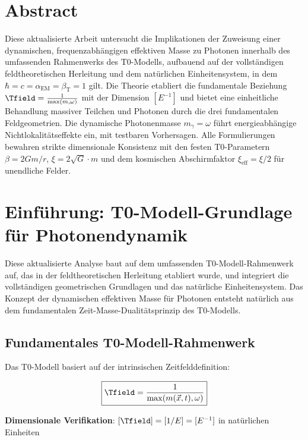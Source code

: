 \section*{Abstract}
		Diese aktualisierte Arbeit untersucht die Implikationen der Zuweisung einer dynamischen, frequenzabhängigen effektiven Masse zu Photonen innerhalb des umfassenden Rahmenwerks des T0-Modells, aufbauend auf der vollständigen feldtheoretischen Herleitung und dem natürlichen Einheitensystem, in dem $\hbar = c = \alpha_{\text{EM}} = \beta_{\text{T}} = 1$ gilt. Die Theorie etabliert die fundamentale Beziehung $\Tfield = \frac{1}{\max(m, \omega)}$ mit der Dimension $[E^{-1}]$ und bietet eine einheitliche Behandlung massiver Teilchen und Photonen durch die drei fundamentalen Feldgeometrien. Die dynamische Photonenmasse $m_\gamma = \omega$ führt energieabhängige Nichtlokalitätseffekte ein, mit testbaren Vorhersagen.  Alle Formulierungen bewahren strikte dimensionale Konsistenz mit den festen T0-Parametern $\beta = 2Gm/r$, $\xi = 2\sqrt{G} \cdot m$ und dem kosmischen Abschirmfaktor $\xi_{\text{eff}} = \xi/2$ für unendliche Felder.

	
	
	\section{Einführung: T0-Modell-Grundlage für Photonendynamik}
	
	Diese aktualisierte Analyse baut auf dem umfassenden T0-Modell-Rahmenwerk auf, das in der feldtheoretischen Herleitung etabliert wurde, und integriert die vollständigen geometrischen Grundlagen und das natürliche Einheitensystem. Das Konzept der dynamischen effektiven Masse für Photonen entsteht natürlich aus dem fundamentalen Zeit-Masse-Dualitätsprinzip des T0-Modells.
	
	\subsection{Fundamentales T0-Modell-Rahmenwerk}
	
	Das T0-Modell basiert auf der intrinsischen Zeitfelddefinition:
	
	\begin{equation}
		\boxed{\Tfield = \frac{1}{\max(m(\vec{x},t), \omega)}}
		\label{eq:intrinsic_time_field}
	\end{equation}
	
	\textbf{Dimensionale Verifikation}: $[\Tfield] = [1/E] = [E^{-1}]$ in natürlichen Einheiten \checkmark
	
